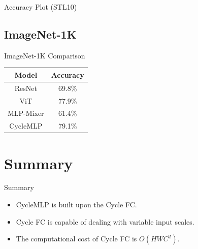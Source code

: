 \documentclass{beamer}
\begin{document}
\begin{frame}{Accuracy Plot (STL10)}
    \centering
\end{frame}

\subsection{ImageNet-1K}

\begin{frame}{ImageNet-1K Comparison}
    \centering
    \begin{tabular}{c c}
        \hline
        Model & Accuracy \\
        \hline
        ResNet & 69.8\% \\
        ViT & 77.9\% \\
        MLP-Mixer & 61.4\% \\
        CycleMLP & 79.1\% \\
        \hline
    \end{tabular}
\end{frame}

\section*{Summary}

\begin{frame}{Summary}
    \begin{itemize}
        \item CycleMLP is built upon the \alert{Cycle FC}.
        \item Cycle FC is capable of dealing with \alert{variable input scales}.
        \item The computational cost of Cycle FC is \alert{$O(HWC^2)$}.
    \end{itemize}
\end{frame}
\end{document}
